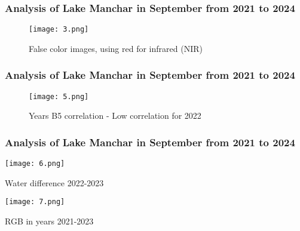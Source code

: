 \documentclass{beamer}
\begin{document}
\begin{frame}
  \frametitle{\small Analysis of Lake Manchar in September from 2021 to 2024} 

    \begin{figure}
        \centering
        \texttt{[image: 3.png]}
        \label{fig:enter-label}
        \caption{False color images, using red for infrared (NIR)}
    \end{figure}
  
\end{frame}


  

\begin{frame}
  \frametitle{\small Analysis of Lake Manchar in September from 2021 to 2024} 

    \begin{figure}
        \centering
        \texttt{[image: 5.png]}
        \label{fig:enter-label}
        \caption{Years B5 correlation - Low correlation for 2022}
    \end{figure}
  
\end{frame}

\begin{frame}
  \frametitle{\small Analysis of Lake Manchar in September from 2021 to 2024} 

   \begin{minipage}{0.48\textwidth}
    \centering
    \texttt{[image: 6.png]}
    \caption{Water difference 2022-2023}
  \end{minipage}
  \hfill
  \begin{minipage}{0.48\textwidth}
    \centering
    \texttt{[image: 7.png]}
    \caption{RGB in years 2021-2023}
  \end{minipage}
  
\end{frame}  
\end{document}
